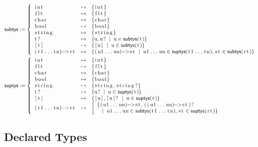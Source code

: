 \documentclass{article}
\newcommand{\code}[1]{\lstinline[columns=fixed]{#1}}
\newcommand{\mc}[1]{\textnormal{\code{#1}}}
\begin{document}
				\begin{align*}
					\mathsf{subtys} &:=
						\left\{
							\begin{array}{lll}
								\mc{int} & \mapsto & \{\mc{int}\}\\
								\mc{flt} & \mapsto & \{\mc{flt}\}\\
								\mc{char} & \mapsto & \{\mc{char}\}\\
								\mc{bool} & \mapsto & \{\mc{bool}\}\\
								\mc{string} & \mapsto & \{\mc{string}\}\\
								\mc{t?} & \mapsto & \{\mc{u},\mc{u?} \;\mid\; \mc{u}\in\mathsf{subtys}(\mc{t})\}\\
								\mc{[t]} & \mapsto & \{\mc{[u]} \;\mid\; \mc{u}\in\mathsf{subtys}(\mc{t})\}\\
								\mc{(t1...tn)->rt} & \mapsto &
									\{\mc{(u1...un)->st} \;\mid\; \mc{u1...un}\in\mathsf{suptys}(\mc{t1...tn}),\mc{st}\in\mathsf{subtys}(\mc{rt})\}
							\end{array}
						\right.\\
					\mathsf{suptys} &:=
						\left\{
							\begin{array}{lll}
								\mc{int} & \mapsto & \{\mc{int}\}\\
								\mc{flt} & \mapsto & \{\mc{flt}\}\\
								\mc{char} & \mapsto & \{\mc{char}\}\\
								\mc{bool} & \mapsto & \{\mc{bool}\}\\
								\mc{string} & \mapsto & \{\mc{string},\mc{string?}\}\\
								\mc{t?} & \mapsto & \{\mc{u?} \;\mid\; \mc{u}\in\mathsf{suptys}(\mc{t})\}\\
								\mc{[t]} & \mapsto & \{\mc{[u]}, \mc{[u]?} \;\mid\; \mc{u}\in\mathsf{suptys}(\mc{t})\}\\
								\mc{(t1...tn)->rt} & \mapsto &
									\left[
									\begin{array}{l}
										\{\mc{(u1...un)->st},\mc{((u1...un)->st)?} \\\ \ \;\mid\; \mc{u1...un}\in\mathsf{subtys}(\mc{t1...tn}),\mc{st}\in\mathsf{suptys}(\mc{rt})\}
									\end{array}
									\right.
							\end{array}
						\right.
				\end{align*}
				
		\subsection{Declared Types}
			
\end{document}
